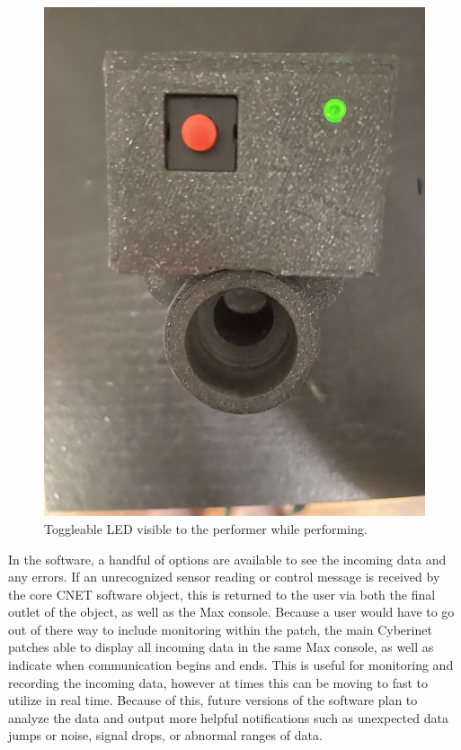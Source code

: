 \begin{figure}
    \centering
    \includegraphics[scale=0.05]{diagrams/IMG_2211.JPG}
    \caption{Toggleable LED visible to the performer while performing.}
    \label{fig:msgLED}
\end{figure}


In the software, a handful of options are available to see the incoming data and any errors. If an unrecognized sensor reading or control message is received by the core CNET software object, this is returned to the user via both the final outlet of the object, as well as the Max console. Because a user would have to go out of there way to include monitoring within the patch, the main Cyberinet patches able to display all incoming data in the same Max console, as well as indicate when communication begins and ends. This is useful for monitoring and recording the incoming data, however at times this can be moving to fast to utilize in real time. Because of this, future versions of the software plan to analyze the data and output more helpful notifications such as unexpected data jumps or noise, signal drops, or abnormal ranges of data.


